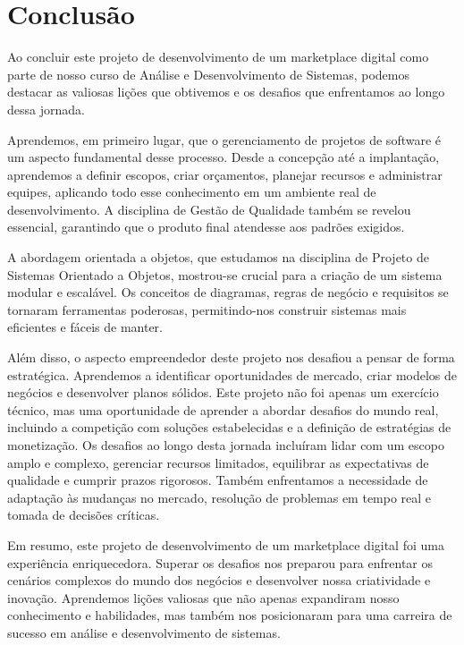 \documentclass[
	12pt,				%
	openright,			%
	twoside,			%
	a4paper,			%
	english,			%
	brazil				%
	]{abntex2}
\begin{document}
\section{Conclusão}

Ao concluir este projeto de desenvolvimento de um marketplace digital como parte de nosso curso de Análise e Desenvolvimento de Sistemas, podemos destacar as valiosas lições que obtivemos e os desafios que enfrentamos ao longo dessa jornada.

Aprendemos, em primeiro lugar, que o gerenciamento de projetos de software é um aspecto fundamental desse processo. Desde a concepção até a implantação, aprendemos a definir escopos, criar orçamentos, planejar recursos e administrar equipes, aplicando todo esse conhecimento em um ambiente real de desenvolvimento. A disciplina de Gestão de Qualidade também se revelou essencial, garantindo que o produto final atendesse aos padrões exigidos.

A abordagem orientada a objetos, que estudamos na disciplina de Projeto de Sistemas Orientado a Objetos, mostrou-se crucial para a criação de um sistema modular e escalável. Os conceitos de diagramas, regras de negócio e requisitos se tornaram ferramentas poderosas, permitindo-nos construir sistemas mais eficientes e fáceis de manter.

Além disso, o aspecto empreendedor deste projeto nos desafiou a pensar de forma estratégica. Aprendemos a identificar oportunidades de mercado, criar modelos de negócios e desenvolver planos sólidos. Este projeto não foi apenas um exercício técnico, mas uma oportunidade de aprender a abordar desafios do mundo real, incluindo a competição com soluções estabelecidas e a definição de estratégias de monetização.
Os desafios ao longo desta jornada incluíram lidar com um escopo amplo e complexo, gerenciar recursos limitados, equilibrar as expectativas de qualidade e cumprir prazos rigorosos. Também enfrentamos a necessidade de adaptação às mudanças no mercado, resolução de problemas em tempo real e tomada de decisões críticas.

Em resumo, este projeto de desenvolvimento de um marketplace digital foi uma experiência enriquecedora. Superar os desafios nos preparou para enfrentar os cenários complexos do mundo dos negócios e desenvolver nossa criatividade e inovação. Aprendemos lições valiosas que não apenas expandiram nosso conhecimento e habilidades, mas também nos posicionaram para uma carreira de sucesso em análise e desenvolvimento de sistemas.
\end{document}
